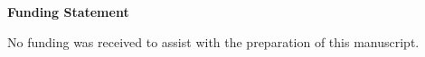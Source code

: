 \documentclass[12pt]{article}
\begin{document}
\begin{center}
\textbf{Funding Statement}
\end{center}

No funding was received to assist with the preparation of this manuscript.
\end{document}
